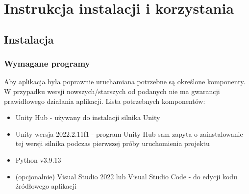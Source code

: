 \documentclass{SGGW-thesis}
\begin{document}
\chapter{Instrukcja instalacji i korzystania}
\section{Instalacja}
\subsection{Wymagane programy}
Aby aplikacja była poprawnie uruchamiana potrzebne są określone komponenty. W przypadku wersji nowszych/starszych od podanych nie ma gwarancji prawidłowego działania aplikacji.
Lista potrzebnych komponentów:
\begin{itemize}
  \item{Unity Hub - używany do instalacji silnika Unity}
  \item{Unity wersja 2022.2.11f1 - program Unity Hub sam zapyta o zainstalowanie tej wersji silnika podczas pierwszej próby uruchomienia projektu}
  \item{Python v3.9.13}
  \item{(opcjonalnie) Visual Studio 2022 lub Visual Studio Code - do edycji kodu źródłowego aplikacji}
\end{itemize}
\end{document}

